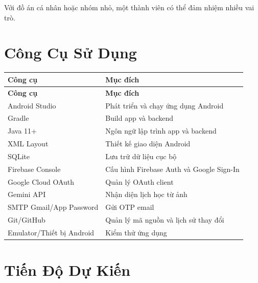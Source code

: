 \documentclass[12pt,a4paper]{report}
\begin{document}
Với đồ án cá nhân hoặc nhóm nhỏ, một thành viên có thể đảm nhiệm nhiều vai trò.

\section{Công Cụ Sử Dụng}

\begin{longtable}{|>{\raggedright\arraybackslash}p{}|>{\raggedright\arraybackslash}p{}|}
\hline
\textbf{Công cụ} & \textbf{Mục đích} \\ \hline
\endfirsthead
\hline
\textbf{Công cụ} & \textbf{Mục đích} \\ \hline
\endhead
Android Studio & Phát triển và chạy ứng dụng Android \\ \hline
Gradle & Build app và backend \\ \hline
Java 11+ & Ngôn ngữ lập trình app và backend \\ \hline
XML Layout & Thiết kế giao diện Android \\ \hline
SQLite & Lưu trữ dữ liệu cục bộ \\ \hline
Firebase Console & Cấu hình Firebase Auth và Google Sign-In \\ \hline
Google Cloud OAuth & Quản lý OAuth client \\ \hline
Gemini API & Nhận diện lịch học từ ảnh \\ \hline
SMTP Gmail/App Password & Gửi OTP email \\ \hline
Git/GitHub & Quản lý mã nguồn và lịch sử thay đổi \\ \hline
Emulator/Thiết bị Android & Kiểm thử ứng dụng \\ \hline
\end{longtable}

\section{Tiến Độ Dự Kiến}
\end{document}
